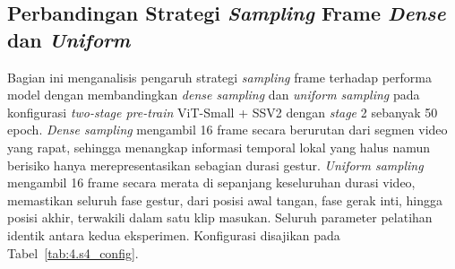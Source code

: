 \subsection{Perbandingan Strategi \textit{Sampling} Frame \textit{Dense} dan \textit{Uniform}} \label{IV.Sek3}

Bagian ini menganalisis pengaruh strategi \textit{sampling} frame terhadap performa model dengan membandingkan \textit{dense sampling} dan \textit{uniform sampling} pada konfigurasi \textit{two-stage pre-train} ViT-Small + SSV2 dengan \textit{stage} 2 sebanyak 50 epoch. \textit{Dense sampling} mengambil 16 frame secara berurutan dari segmen video yang rapat, sehingga menangkap informasi temporal lokal yang halus namun berisiko hanya merepresentasikan sebagian durasi gestur. \textit{Uniform sampling} mengambil 16 frame secara merata di sepanjang keseluruhan durasi video, memastikan seluruh fase gestur, dari posisi awal tangan, fase gerak inti, hingga posisi akhir, terwakili dalam satu klip masukan. Seluruh parameter pelatihan identik antara kedua eksperimen. Konfigurasi disajikan pada Tabel~\ref{tab:4.s4_config}.\par


